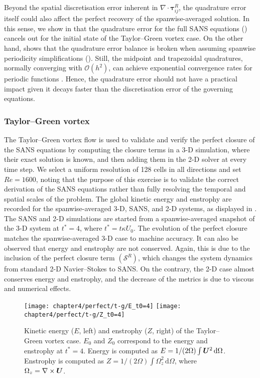 \documentclass[../main.tex]{subfiles}
\begin{document}
Beyond the spatial discretisation error inherent in $\nabla\cdot\boldsymbol\tau_{ij}^R$, the quadrature error itself could also affect the perfect recovery of the spanwise-averaged solution.
In this sense, we show in  that the quadrature error for the full SANS equations () cancels out for the initial state of the Taylor--Green vortex case.
On the other hand,  shows that the quadrature error balance is broken when assuming spanwise periodicity simplifications ().
Still, the midpoint and trapezoidal quadratures, normally converging with $\mathcal{O}(h^2)$, can achieve exponential convergence rates for periodic functions \citep{Weideman2002,Trefethen2014}.
Hence, the quadrature error should not have a practical impact given it decays faster than the discretisation error of the governing equations.

\subsubsection*{Taylor--Green vortex}

The Taylor--Green vortex flow is used to validate and verify the perfect closure of the SANS equations by computing the closure terms in a 3-D simulation, where their exact solution is known, and then adding them in the 2-D solver at every time step.
We select a uniform resolution of 128 cells in all directions and set $Re=1600$, noting that the purpose of this exercise is to validate the correct derivation of the SANS equations rather than fully resolving the temporal and spatial scales of the problem.
The global kinetic energy and enstrophy are recorded for the spanwise-averaged 3-D,  SANS, and 2-D systems, as displayed in . 
The SANS and 2-D simulations are started from a spanwise-averaged snapshot of the 3-D system at $t^*=4$, where $t^*=t\kappa U_0$.
The evolution of the perfect closure matches the spanwise-averaged 3-D case to machine accuracy.
It can also be observed that energy and enstrophy are not conserved.
Again, this is due to the inclusion of the perfect closure term $(\mathcal{S}^R)$, which changes the system dynamics from standard 2-D Navier--Stokes to SANS.
On the contrary, the 2-D case  almost conserves energy and enstrophy, and the decrease of the metrics is due to viscous and numerical effects.
 
\begin{figure}[!t]
\centering
\texttt{[image: chapter4/perfect/t-g/E\_t0=4]}
\texttt{[image: chapter4/perfect/t-g/Z\_t0=4]}
\caption{Kinetic energy ($E$, left) and enstrophy ($Z$, right) of the Taylor--Green vortex case.  
$E_0$ and $Z_0$ correspond to the energy and enstrophy at $t^*=4$. 
Energy is computed as $E=1/(2\Omega)\int \boldsymbol{U}^2\,\mathrm{d}\Omega$.
Enstrophy is computed as $Z=1/(2\Omega)\int\Omega_z^2\,\mathrm{d}\Omega$, where $\Omega_z=\nabla\times\boldsymbol{U}$.}\label{fig:perfect_t-g}
\end{figure}
\end{document}
